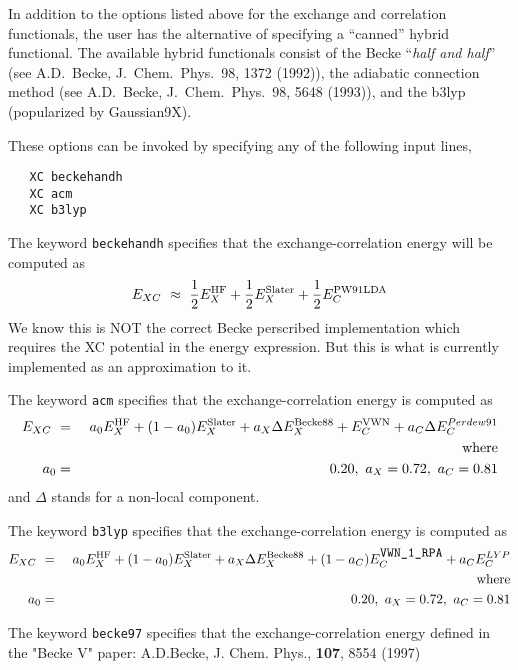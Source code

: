 In addition to the options listed above for the exchange and correlation
functionals, the user has the alternative of specifying a ``canned'' hybrid
functional.  The available hybrid functionals consist of the Becke
``{\sl half and half}'' (see A.D.~Becke, J.~Chem.~Phys.~98, 1372 (1992)), the
adiabatic connection method (see A.D.~Becke, J.~Chem.~Phys.~98, 5648
(1993)), and the b3lyp (popularized by Gaussian9X).

These options can be invoked by specifying any of the following input lines,
\begin{verbatim}
   XC beckehandh
   XC acm
   XC b3lyp
\end{verbatim}

The keyword \verb+beckehandh+ specifies that the exchange-correlation energy will be
computed as 
\begin{eqnarray*}
E_{XC} \ \approx \ \frac{1}{2} E^{\rm HF}_X + \frac{1}{2} E^{\rm
  Slater}_{X} + \frac{1}{2} E^{\rm PW91LDA}_{C}
\end{eqnarray*}
We know this is NOT the correct Becke perscribed implementation which
requires the XC potential in the energy expression.  But this is what
is currently implemented as an approximation to it.

\clearpage


The keyword \verb+acm+ specifies that the exchange-correlation energy
is computed as
\begin{eqnarray*}
E_{XC} \ &=& \ a_0 E^{\rm HF}_X + (1-a_0) E^{\rm Slater}_{X} +
a_X \Delta E^{\rm Becke88}_{X} + E^{\rm VWN}_C + a_C \Delta E^{Perdew91}_C \\
& &{\rm where } \\
a_0 &=& 0.20, \ a_X = 0.72, \ a_C = 0.81
\end{eqnarray*}
and $\Delta$ stands for a non-local component.


The keyword \verb+b3lyp+ specifies that the exchange-correlation energy
is computed as
\begin{eqnarray*}
E_{XC} \ &=& \ a_0 E^{\rm HF}_X + (1-a_0) E^{\rm Slater}_{X} +
a_X \Delta E^{\rm Becke88}_{X} + (1-a_C)E^{\rm \verb+VWN_1_RPA+}_C + a_C E^{LYP}_C \\
& &{\rm where } \\
a_0 &=& 0.20, \ a_X = 0.72, \ a_C = 0.81
\end{eqnarray*}

The keyword \verb+becke97+ specifies that the exchange-correlation energy
defined in the "Becke V" paper: A.D.Becke,
J. Chem. Phys., {\bf 107}, 8554 (1997)


